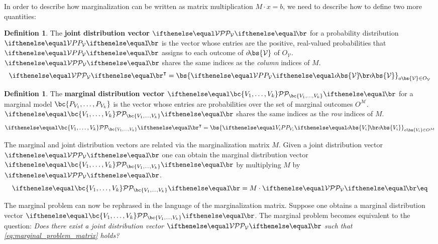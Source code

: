 \documentclass[aps, 10pt, english, twoside, pra, nofootinbib, longbibliography]{revtex4-1}
\theoremstyle{plain}
\theoremstyle{definition}
\newtheorem{definition}[theorem]{Definition}
\theoremstyle{remark}
\newcommand{\term}[1]{\textcolor{Mahogany}{\textbf{#1}}}
\newcommand{\outc}[1]{o\!\bs{#1}}
\begin{document}
    In order to describe how marginalization can be written as matrix multiplication $M \cdot x = b$, we need to describe how to define two more quantities:

    \begin{definition}
        The \term{joint distribution vector} $\probvec[\mathcal{V}]$ for a probability distribution $\prob[\mathcal{V}]$ is the vector whose entries are the positive, real-valued probabilities that $\prob[\mathcal{V}]$ assigns to each outcome of $\outc{\mathcal{V}}$ of $O_\mathcal{V}$. $\probvec[\mathcal{V}]$ shares the same indices as the \textit{column} indices of $M$.
        \[ \probvec[\mathcal{V}]^\intercal = \bs{\prob[\mathcal{V}][\outc{\mathcal{V}}]}_{o\bs{\mathcal{V}} \in O_{\mathcal{V}}} \]
    \end{definition}
    \begin{definition}
        The \term{marginal distribution vector} $\probvec[\bc{V_1, \ldots, V_k}]$ for a marginal model $\bc{P_{V_1}, \ldots, P_{V_k}}$ is the vector whose entries are probabilities over the set of marginal outcomes $O^{\mathcal{M}}$. $\probvec[\bc{V_1, \ldots, V_k}]$ shares the same indices as the \textit{row} indices of $M$.
        \[ \probvec[\bc{V_1, \ldots, V_k}]^\intercal = \bs{\prob[V_i][\outc{V_i}] }_{o\bs{V_i} \in O^{\mathcal{M}}} \]
    \end{definition}
    The marginal and joint distribution vectors are related via the marginalization matrix $M$. Given a joint distribution vector $\probvec[\mathcal{V}]$ one can obtain the marginal distribution vector $\probvec[\bc{V_1, \ldots, V_k}]$ by multiplying $M$ by $\probvec[\mathcal{V}]$.
    \[ \probvec[\bc{V_1, \ldots, V_k}] = M \cdot \probvec[\mathcal{V}] \eq \label{eq:marginal_problem_matrix} \]

    The marginal problem can now be rephrased in the language of the marginalization matrix. Suppose one obtains a marginal distribution vector $\probvec[\bc{V_1, \ldots, V_k}]$. The marginal problem becomes equivalent to the question: \textit{Does there exist a joint distribution vector $\probvec[\mathcal{V}]$ such that \cref{eq:marginal_problem_matrix} holds?}
\end{document}
